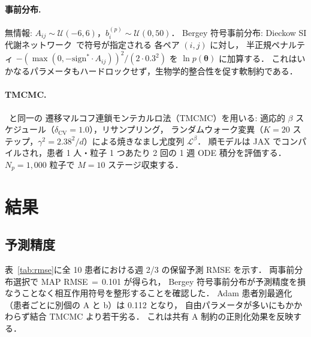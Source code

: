 \documentclass[11pt,a4paper]{article}
\newcommand{\btheta}{\boldsymbol{\theta}}
\begin{document}
\paragraph{事前分布.}
無情報: $A_{ij}\sim\mathcal{U}(-6,6)$，$b_i^{(p)}\sim\mathcal{U}(0,50)$．
Bergey 符号事前分布: Dieckow SI 代謝ネットワーク~\cite{Dieckow2025InVivo}で符号が指定される
各ペア $(i,j)$ に対し，
半正規ペナルティ $-(\max(0, -\mathrm{sign}^*\cdot A_{ij}))^2/(2\cdot 0.3^2)$ を
$\ln p(\btheta)$ に加算する．
これはいかなるパラメータもハードロックせず，生物学的整合性を促す軟制約である．

\paragraph{TMCMC.}
~\cite{NishiokaTMCMC2025,ChingChen2007TMCMC,Betz2016TMCMC}と同一の
遷移マルコフ連鎖モンテカルロ法（TMCMC）を用いる:
適応的 $\beta$ スケジュール（$\delta_{\mathrm{CV}}=1.0$），リサンプリング，
ランダムウォーク変異（$K=20$ ステップ，$\gamma^2=2.38^2/d$）による焼きなまし尤度列 $\mathcal{L}^\beta$．
順モデルは JAX でコンパイルされ，患者 1 人・粒子 1 つあたり 2 回の 1 週 ODE 積分を評価する．
$N_p=1{,}000$ 粒子で $M=10$ ステージ収束する．

\section{結果}
\label{sec:results}

\subsection{予測精度}

表~\ref{tab:rmse}に全 10 患者における週 2/3 の保留予測 RMSE を示す．
両事前分布選択で MAP RMSE\,$=\,$0.101 が得られ，
Bergey 符号事前分布が予測精度を損なうことなく相互作用符号を整形することを確認した．
Adam 患者別最適化（患者ごとに別個の A と b）は 0.112 となり，
自由パラメータが多いにもかかわらず結合 TMCMC より若干劣る．
これは共有 A 制約の正則化効果を反映する．
\end{document}
